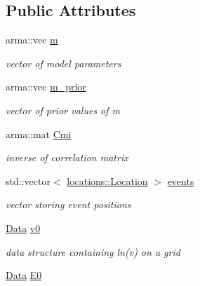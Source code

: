 \subsection*{Public Attributes}
\begin{DoxyCompactItemize}
\item 
\hypertarget{class_m_a93ca113823caa7be72cdb37b9f38f2b2}{}arma\+::vec \hyperlink{class_m_a93ca113823caa7be72cdb37b9f38f2b2}{m}\label{class_m_a93ca113823caa7be72cdb37b9f38f2b2}

\begin{DoxyCompactList}\small\item\em vector of model parameters \end{DoxyCompactList}\item 
\hypertarget{class_m_ae50d1e51deae3028c315c8e1376ecac3}{}arma\+::vec \hyperlink{class_m_ae50d1e51deae3028c315c8e1376ecac3}{m\+\_\+prior}\label{class_m_ae50d1e51deae3028c315c8e1376ecac3}

\begin{DoxyCompactList}\small\item\em vector of prior values of m \end{DoxyCompactList}\item 
\hypertarget{class_m_ae65c01bcdca53a92ed9c79d4236a3adb}{}arma\+::mat \hyperlink{class_m_ae65c01bcdca53a92ed9c79d4236a3adb}{Cmi}\label{class_m_ae65c01bcdca53a92ed9c79d4236a3adb}

\begin{DoxyCompactList}\small\item\em inverse of correlation matrix \end{DoxyCompactList}\item 
\hypertarget{class_m_ab653e08675522b7db973777825ee5eb2}{}std\+::vector$<$ \hyperlink{classlocations_1_1_location}{locations\+::\+Location} $>$ \hyperlink{class_m_ab653e08675522b7db973777825ee5eb2}{events}\label{class_m_ab653e08675522b7db973777825ee5eb2}

\begin{DoxyCompactList}\small\item\em vector storing event positions \end{DoxyCompactList}\item 
\hypertarget{class_m_a507aff114ae0f48cbc140df0307e2f09}{}\hyperlink{class_data}{Data} \hyperlink{class_m_a507aff114ae0f48cbc140df0307e2f09}{v0}\label{class_m_a507aff114ae0f48cbc140df0307e2f09}

\begin{DoxyCompactList}\small\item\em data structure containing ln(v) on a grid \end{DoxyCompactList}\item 
\hypertarget{class_m_a82088ed3c05ba157b2a989bf8b7234a2}{}\hyperlink{class_data}{Data} \hyperlink{class_m_a82088ed3c05ba157b2a989bf8b7234a2}{E0}\label{class_m_a82088ed3c05ba157b2a989bf8b7234a2}


\end{DoxyCompactItemize}
